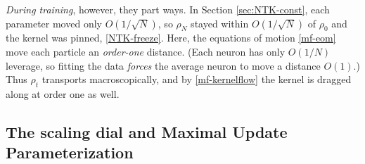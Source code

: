 \documentclass[11pt]{article}
\begin{document}
\emph{During training}, however, they part ways. In Section \ref{sec:NTK-const}, each parameter moved only $O(1/\sqrt N)$, so $\rho_N$ stayed within $O(1/\sqrt N)$ of $\rho_0$ and the kernel was pinned, \eqref{NTK-freeze}. Here, the equations of motion \eqref{mf-eom} move each particle an \emph{order-one} distance. (Each neuron has only $O(1/N)$ leverage, so fitting the data \emph{forces} the average neuron to move a distance $O(1)$.) Thus $\rho_t$ transports macroscopically, and by \eqref{mf-kernelflow} the kernel is dragged along at order one as well. 


%

\subsection{The scaling dial and Maximal Update Parameterization}
\label{sec:MFT-dial}
\end{document}
